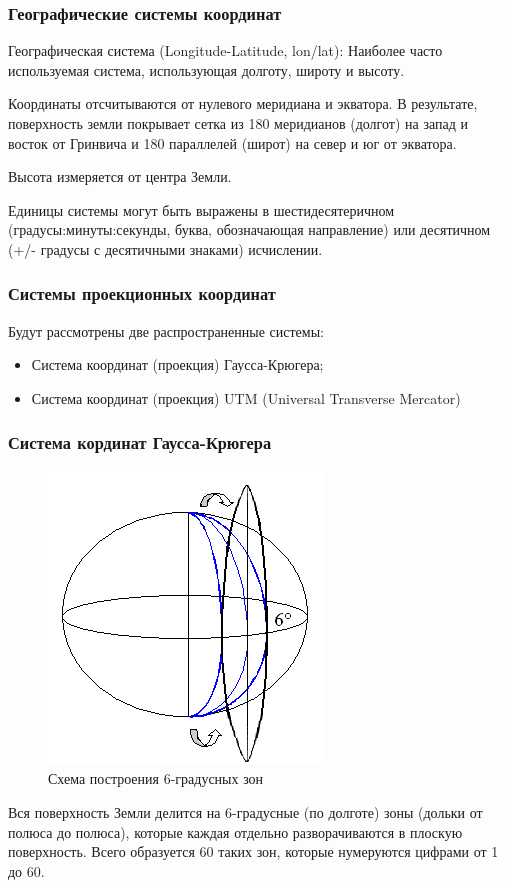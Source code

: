 \begin{frame}
    \frametitle{Географические системы координат}

    Географическая система (Longitude-Latitude, lon/lat): Наиболее часто используемая система, использующая долготу, широту и высоту.

    Координаты отсчитываются от нулевого меридиана и экватора. В результате, поверхность земли покрывает сетка из 180 меридианов (долгот) на запад и восток от Гринвича и 180 параллелей (широт) на север и юг от экватора.

    Высота измеряется от центра Земли.

    Единицы системы могут быть выражены в шестидесятеричном (градусы:минуты:секунды, буква, обозначающая направление) или десятичном (+/- градусы с десятичными знаками) исчислении.
\end{frame}


\begin{frame}
    \frametitle{Системы проекционных координат}
    Будут рассмотрены две распространенные системы:
    \begin{itemize}
        \item Система координат (проекция) Гаусса-Крюгера;
        \item Система координат (проекция) UTM (Universal Transverse Mercator)
    \end{itemize}

\end{frame}

\begin{frame}
    \frametitle{Система кординат Гаусса-Крюгера}
    \begin{figure}[!ht]
        \begin{center}
            \includegraphics[width=0.4\columnwidth]{./coordinates/img/gauss_kruger1.png}
        \end{center}
        \caption{Схема построения 6-градусных зон}
    \end{figure}
    Вся поверхность Земли делится на 6-градусные (по долготе) зоны (дольки от полюса до полюса), которые каждая отдельно разворачиваются в плоскую поверхность. Всего образуется 60 таких зон, которые нумеруются цифрами от 1 до 60.

\end{frame}

